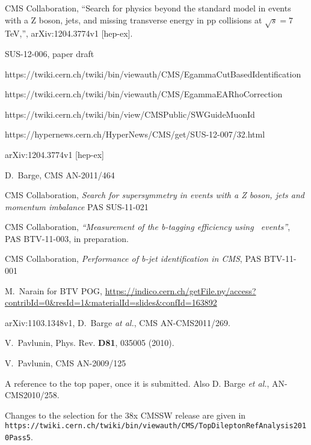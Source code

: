 \begin{thebibliography}{10}

 CMS Collaboration, ``Search for physics beyond the standard model in events with a Z boson, jets, and missing transverse energy in pp collisions at $\sqrt{s} = 7$ TeV,'', 	arXiv:1204.3774v1 [hep-ex].

 SUS-12-006, paper draft

 https://twiki.cern.ch/twiki/bin/viewauth/CMS/EgammaCutBasedIdentification

 https://twiki.cern.ch/twiki/bin/viewauth/CMS/EgammaEARhoCorrection

 https://twiki.cern.ch/twiki/bin/view/CMSPublic/SWGuideMuonId

 https://hypernews.cern.ch/HyperNews/CMS/get/SUS-12-007/32.html

 	arXiv:1204.3774v1 [hep-ex]

 D.~Barge, CMS AN-2011/464

 CMS Collaboration, {{\it Search for supersymmetry in events with a Z boson, jets and momentum imbalance}} PAS SUS-11-021

 CMS Collaboration, {{\it ``Measurement of the b-tagging efficiency using \ttbar\ events''}}, 
	PAS BTV-11-003, in preparation.

 CMS Collaboration, {{\it Performance of b-jet identification in CMS}}, PAS BTV-11-001

 M.~Narain for BTV POG, \url{https://indico.cern.ch/getFile.py/access?contribId=0&resId=1&materialId=slides&confId=163892}

 arXiv:1103.1348v1, D.~Barge {\em at al.}, CMS AN-CMS2011/269.

 V.~Pavlunin, Phys. Rev. {\bf D81}, 035005 (2010).
    
 V.~Pavlunin, CMS AN-2009/125

 A reference to the top paper, once it is submitted.  Also
D. Barge {\em et al.}, AN-CMS2010/258.  

 Changes to the selection for the 38x CMSSW release are given in 
{\tt https://twiki.cern.ch/twiki/bin/viewauth/CMS/TopDileptonRefAnalysis2010Pass5}.


\end{thebibliography}
